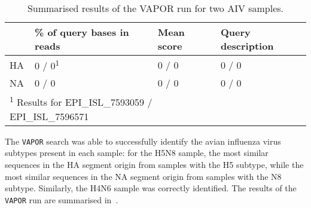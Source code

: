 \setlength{\tabcolsep}{10pt}
\begin{table}[]
    \centering
    \begin{tabular}{@{}llll@{}}
    \toprule
                & \textbf{\% of query bases in reads} & \textbf{Mean score} & \textbf{Query description} \\ \midrule
    HA & 0 / 0\textsuperscript{1}                      & 0 / 0      & 0 / 0             \\
    NA & 0 / 0                      & 0 / 0      & 0 / 0             \\
    \bottomrule
    \multicolumn{3}{l}{\textsuperscript{1} Results for EPI\_ISL\_7593059 / EPI\_ISL\_7596571}
    \end{tabular}
    \caption{Summarised results of the VAPOR run for two AIV samples.}
\label{tab:4-aiv-vapor}
\end{table}

The \texttt{VAPOR} search was able to successfully identify the avian influenza virus subtypes present in each sample: for the H5N8 sample, the  most similar sequences in the HA segment origin from samples with the H5 subtype, while the  most similar sequences in the NA segment origin from samples with the N8 subtype. Similarly, the H4N6 sample was correctly identified. The results of the \texttt{VAPOR} run are summarised in~.


